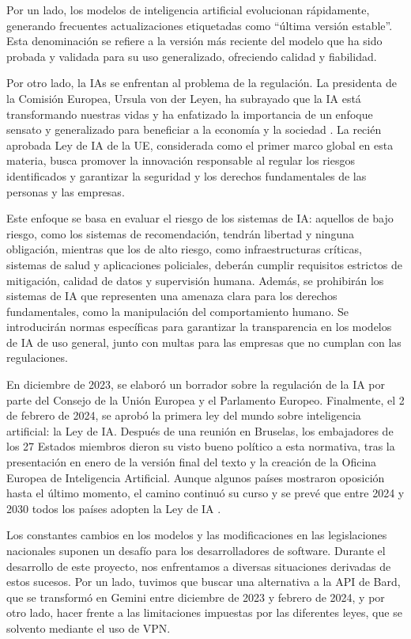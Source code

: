 Por un lado, los modelos de inteligencia artificial evolucionan rápidamente, generando frecuentes actualizaciones etiquetadas como ``última versión estable''. Esta denominación se refiere a la versión más reciente del modelo que ha sido probada y validada para su uso generalizado, ofreciendo calidad y fiabilidad.

Por otro lado, la IAs se enfrentan al problema de la regulación. La presidenta de la Comisión Europea, Ursula von der Leyen, ha subrayado que la IA está transformando nuestras vidas y ha enfatizado la importancia de un enfoque sensato y generalizado para beneficiar a la economía y la sociedad \citep{ComisionEuropea-ComunicadoPrensa-LeyIA}. La recién aprobada Ley de IA de la UE, considerada como el primer marco global en esta materia, busca promover la innovación responsable al regular los riesgos identificados y garantizar la seguridad y los derechos fundamentales de las personas y las empresas.

Este enfoque se basa en evaluar el riesgo de los sistemas de IA: aquellos de bajo riesgo, como los sistemas de recomendación, tendrán libertad y ninguna obligación, mientras que los de alto riesgo, como infraestructuras críticas, sistemas de salud y aplicaciones policiales, deberán cumplir requisitos estrictos de mitigación, calidad de datos y supervisión humana. Además, se prohibirán los sistemas de IA que representen una amenaza clara para los derechos fundamentales, como la manipulación del comportamiento humano. Se introducirán normas específicas para garantizar la transparencia en los modelos de IA de uso general, junto con multas para las empresas que no cumplan con las regulaciones.

En diciembre de 2023, se elaboró un borrador sobre la regulación de la IA por parte del Consejo de la Unión Europea y el Parlamento Europeo. Finalmente, el 2 de febrero de 2024, se aprobó la primera ley del mundo sobre inteligencia artificial: la Ley de IA. Después de una reunión en Bruselas, los embajadores de los 27 Estados miembros dieron su visto bueno político a esta normativa, tras la presentación en enero de la versión final del texto y la creación de la Oficina Europea de Inteligencia Artificial. Aunque algunos países mostraron oposición hasta el último momento, el camino continuó su curso y se prevé que entre 2024 y 2030 todos los países adopten la Ley de IA \citep{ElDerecho-LeyIA}.

Los constantes cambios en los modelos y las modificaciones en las legislaciones nacionales suponen un desafío para los desarrolladores de software. Durante el desarrollo de este proyecto, nos enfrentamos a diversas situaciones derivadas de estos sucesos. Por un lado, tuvimos que buscar una alternativa a la API de Bard, que se transformó en Gemini entre diciembre de 2023 y febrero de 2024, y por otro lado, hacer frente a las limitaciones impuestas por las diferentes leyes, que se solvento mediante el uso de VPN.

